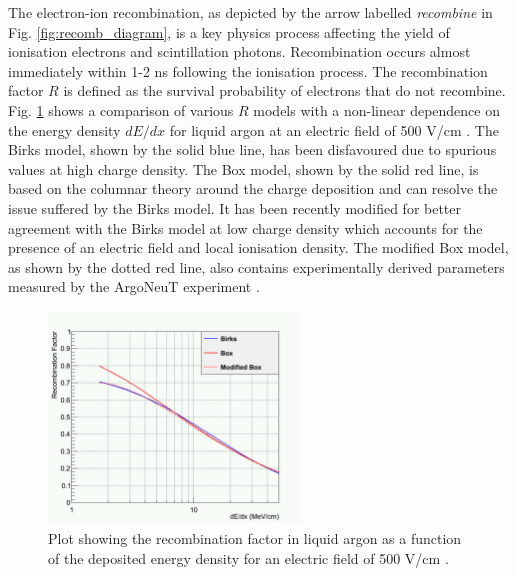The electron-ion recombination, as depicted by the arrow labelled \textit{recombine} in Fig. \ref{fig:recomb_diagram}, is a key physics process affecting the yield of ionisation electrons and scintillation photons.
Recombination occurs almost immediately within 1-2 ns following the ionisation process.                                                                                                                
The recombination factor $R$ is defined as the survival probability of electrons that do not recombine.
Fig. \ref{fig:recomb_graph} shows a comparison of various $R$ models with a non-linear dependence on the energy density $dE/dx$ for liquid argon at an electric field of 500 V/cm \cite{argoneut_recomb}.
The Birks model, shown by the solid blue line, has been disfavoured due to spurious values at high charge density.
The Box model, shown by the solid red line, is based on the columnar theory around the charge deposition and can resolve the issue suffered by the Birks model.
It has been recently modified for better agreement with the Birks model at low charge density which accounts for the presence of an electric field and local ionisation density.
The modified Box model, as shown by the dotted red line, also contains experimentally derived parameters measured by the ArgoNeuT experiment \cite{argoneut_recomb}.


\begin{figure}[ht!] 
\centering    
\includegraphics[width=0.6\textwidth]{recomb_graph}
\caption[recomb_graph]{
Plot showing the recombination factor in liquid argon as a function of the deposited energy density for an electric field of 500 V/cm \cite{argoneut_recomb}.
}
\label{fig:recomb_graph}
\end{figure}

